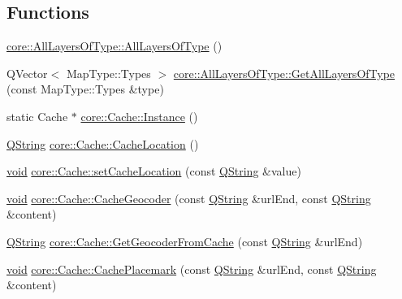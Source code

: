 \subsection*{\-Functions}
\begin{DoxyCompactItemize}
\item 
\hyperlink{group___o_p_map_widget_gac9c4b0c8a890cbccd4a9c16a57be28c4}{core\-::\-All\-Layers\-Of\-Type\-::\-All\-Layers\-Of\-Type} ()
\item 
\-Q\-Vector$<$ \-Map\-Type\-::\-Types $>$ \hyperlink{group___o_p_map_widget_gaa620f4fda0c58c2ff2919a2fef795074}{core\-::\-All\-Layers\-Of\-Type\-::\-Get\-All\-Layers\-Of\-Type} (const \-Map\-Type\-::\-Types \&type)
\item 
static \-Cache $\ast$ \hyperlink{group___o_p_map_widget_ga44699cf1986c874eb8375e3d795a1456}{core\-::\-Cache\-::\-Instance} ()
\item 
\hyperlink{group___u_a_v_objects_plugin_gab9d252f49c333c94a72f97ce3105a32d}{\-Q\-String} \hyperlink{group___o_p_map_widget_ga3b971bf3f42b18ca30dc670b0a3252fa}{core\-::\-Cache\-::\-Cache\-Location} ()
\item 
\hyperlink{group___u_a_v_objects_plugin_ga444cf2ff3f0ecbe028adce838d373f5c}{void} \hyperlink{group___o_p_map_widget_ga426941e0eaaa025997f73cd20da01189}{core\-::\-Cache\-::set\-Cache\-Location} (const \hyperlink{group___u_a_v_objects_plugin_gab9d252f49c333c94a72f97ce3105a32d}{\-Q\-String} \&value)
\item 
\hyperlink{group___u_a_v_objects_plugin_ga444cf2ff3f0ecbe028adce838d373f5c}{void} \hyperlink{group___o_p_map_widget_ga1c59fdf57a8e404d9069644cc2a06d68}{core\-::\-Cache\-::\-Cache\-Geocoder} (const \hyperlink{group___u_a_v_objects_plugin_gab9d252f49c333c94a72f97ce3105a32d}{\-Q\-String} \&url\-End, const \hyperlink{group___u_a_v_objects_plugin_gab9d252f49c333c94a72f97ce3105a32d}{\-Q\-String} \&content)
\item 
\hyperlink{group___u_a_v_objects_plugin_gab9d252f49c333c94a72f97ce3105a32d}{\-Q\-String} \hyperlink{group___o_p_map_widget_ga03c3c69129aa5d774e0cfc1b7cc4ace7}{core\-::\-Cache\-::\-Get\-Geocoder\-From\-Cache} (const \hyperlink{group___u_a_v_objects_plugin_gab9d252f49c333c94a72f97ce3105a32d}{\-Q\-String} \&url\-End)
\item 
\hyperlink{group___u_a_v_objects_plugin_ga444cf2ff3f0ecbe028adce838d373f5c}{void} \hyperlink{group___o_p_map_widget_ga605683519dbd3609033f61edfdbd6da3}{core\-::\-Cache\-::\-Cache\-Placemark} (const \hyperlink{group___u_a_v_objects_plugin_gab9d252f49c333c94a72f97ce3105a32d}{\-Q\-String} \&url\-End, const \hyperlink{group___u_a_v_objects_plugin_gab9d252f49c333c94a72f97ce3105a32d}{\-Q\-String} \&content)

\end{DoxyCompactItemize}
